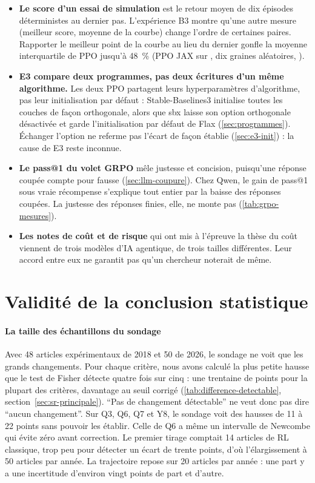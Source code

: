 \begin{itemize}
  \item \textbf{Le score d'un essai de simulation} est le retour moyen de dix épisodes déterministes
        au dernier pas. L'expérience B3 montre qu'une autre mesure (meilleur score, moyenne de la
        courbe) change l'ordre de certaines paires. Rapporter le meilleur point de la courbe au lieu
        du dernier gonfle la moyenne interquartile de PPO jusqu'à 48~\% (PPO JAX sur
        , dix graines aléatoires, ).
  \item \textbf{E3 compare deux programmes, pas deux écritures d'un même algorithme.} Les deux PPO
        partagent leurs hyperparamètres d'algorithme, pas leur initialisation par défaut :
        Stable-Baselines3 initialise toutes les couches de façon orthogonale, alors que sbx laisse son
        option orthogonale désactivée et garde l'initialisation par défaut de Flax
        (\cref{sec:programmes}). Échanger l'option ne referme pas l'écart de façon établie
        (\cref{sec:e3-init}) : la cause de E3 reste inconnue.
  \item \textbf{Le pass@1 du volet GRPO} mêle justesse et concision, puisqu'une réponse coupée
        compte pour fausse (\cref{sec:llm-coupure}). Chez Qwen, le gain de pass@1 sous vraie
        récompense s'explique tout entier par la baisse des réponses coupées. La justesse des
        réponses finies, elle, ne monte pas (\cref{tab:grpo-mesures}).
  \item \textbf{Les notes de coût et de risque} qui ont mis à l'épreuve la thèse du coût viennent de
        trois modèles d'IA agentique, de trois tailles différentes. Leur accord entre eux ne
        garantit pas qu'un chercheur noterait de même.
\end{itemize}

\section{Validité de la conclusion statistique}
\label{sec:val-stat}

\paragraph{La taille des échantillons du sondage} Avec 48 articles expérimentaux de 2018 et 50 de
2026, le sondage ne voit que les grands changements. Pour chaque critère, nous avons calculé la
plus petite hausse que le test de Fisher détecte quatre fois sur cinq : une trentaine de points pour la
plupart des critères, davantage au seuil corrigé (\cref{tab:difference-detectable},
section~\ref{sec:sr-principale}). \enquote{Pas de changement détectable} ne
veut donc pas dire \enquote{aucun changement}. Sur Q3, Q6, Q7 et Y8, le sondage voit des hausses de
11 à 22 points sans pouvoir les établir. Celle de Q6 a même un intervalle de Newcombe qui évite zéro
avant correction. Le premier tirage comptait 14 articles de RL
classique, trop peu pour détecter un écart de trente points, d'où l'élargissement à 50 articles par année. La
trajectoire repose sur 20 articles par année : une part y a une incertitude d'environ vingt points
de part et d'autre.

